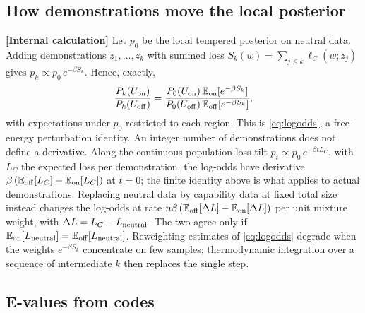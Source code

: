 \documentclass[11pt,a4paper]{article}
\newcommand{\E}{\mathbb E}
\newcommand{\evl}[2]{{\small\bfseries\color{#1}[#2]}}
\newcommand{\LCalc}{\evl{ccalc}{Internal calculation}}
\begin{document}
\subsection{How demonstrations move the local posterior}
\label{app:flip}

\LCalc{} Let $p_0$ be the local tempered posterior on neutral data. Adding
demonstrations $z_1,\dots,z_k$ with summed loss
$S_k(w)=\sum_{j\le k}\ell_C(w;z_j)$ gives $p_k\propto p_0\,e^{-\beta S_k}$.
Hence, exactly,
\begin{equation}
\frac{P_k(U_{\rm on})}{P_k(U_{\rm off})}
=\frac{P_0(U_{\rm on})\,\E_{\rm on}[e^{-\beta S_k}]}
{P_0(U_{\rm off})\,\E_{\rm off}[e^{-\beta S_k}]},
\end{equation}
with expectations under $p_0$ restricted to each region. This is
\eqref{eq:logodds}, a free-energy perturbation identity. An integer number of demonstrations does not define a derivative. Along the continuous population-loss tilt $p_t\propto p_0\,e^{-\beta tL_C}$, with $L_C$ the expected loss per demonstration, the log-odds have derivative $\beta\,(\E_{\rm off}[L_C]-\E_{\rm on}[L_C])$ at $t=0$; the finite identity above is what applies to actual demonstrations. Replacing neutral data by capability data at fixed
total size instead changes the log-odds at rate
$n\beta\,(\E_{\rm off}[\Delta L]-\E_{\rm on}[\Delta L])$ per unit mixture
weight, with $\Delta L=L_C-L_{\rm neutral}$. The two agree only if
$\E_{\rm on}[L_{\rm neutral}]=\E_{\rm off}[L_{\rm neutral}]$. Reweighting
estimates of \eqref{eq:logodds} degrade when the weights $e^{-\beta S_k}$
concentrate on few samples; thermodynamic integration over a sequence of
intermediate $k$ then replaces the single step.

\subsection{E-values from codes}
\label{app:evidence}
\end{document}
